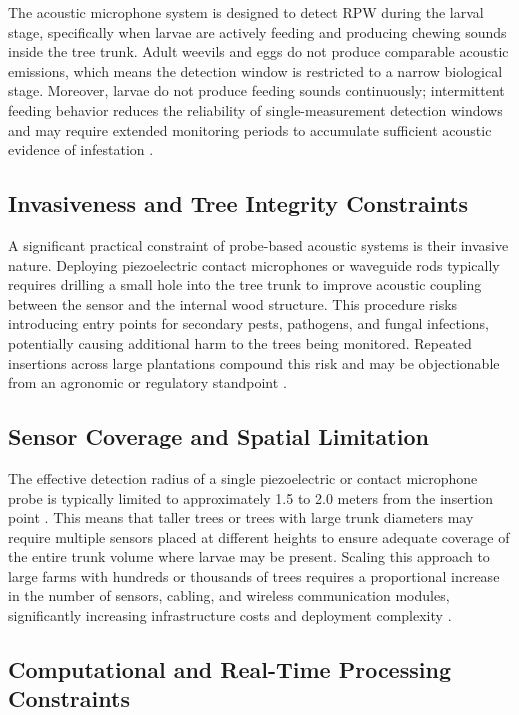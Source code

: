 \documentclass[12pt,a4paper,oneside]{memoir}
\begin{document}
The acoustic microphone system is designed to detect RPW during the larval stage, specifically when larvae are actively feeding and producing chewing sounds inside the tree trunk. Adult weevils and eggs do not produce comparable acoustic emissions, which means the detection window is restricted to a narrow biological stage. Moreover, larvae do not produce feeding sounds continuously; intermittent feeding behavior reduces the reliability of single-measurement detection windows and may require extended monitoring periods to accumulate sufficient acoustic evidence of infestation \cite{sutanto2023,wang2021}.
 
\subsection{Invasiveness and Tree Integrity Constraints}
 
A significant practical constraint of probe-based acoustic systems is their invasive nature. Deploying piezoelectric contact microphones or waveguide rods typically requires drilling a small hole into the tree trunk to improve acoustic coupling between the sensor and the internal wood structure. This procedure risks introducing entry points for secondary pests, pathogens, and fungal infections, potentially causing additional harm to the trees being monitored. Repeated insertions across large plantations compound this risk and may be objectionable from an agronomic or regulatory standpoint \cite{pinhas2008,karar2022}.
 
\subsection{Sensor Coverage and Spatial Limitation}
 
The effective detection radius of a single piezoelectric or contact microphone probe is typically limited to approximately 1.5 to 2.0 meters from the insertion point \cite{pinhas2008,karar2022}. This means that taller trees or trees with large trunk diameters may require multiple sensors placed at different heights to ensure adequate coverage of the entire trunk volume where larvae may be present. Scaling this approach to large farms with hundreds or thousands of trees requires a proportional increase in the number of sensors, cabling, and wireless communication modules, significantly increasing infrastructure costs and deployment complexity \cite{pinhas2008,karar2022,saleem2022}.
 
\subsection{Computational and Real-Time Processing Constraints}
 
\end{document}
